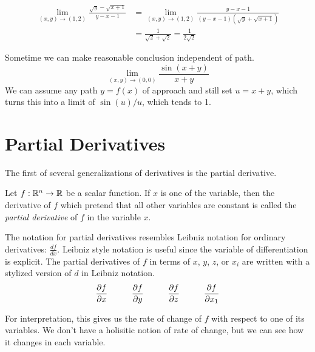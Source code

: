 \documentclass[fleqn,letterpaper]{report}
\begin{document}
\begin{example}
\begin{align*}
\lim_{(x,y) \rightarrow (1,2)} \frac{\sqrt{y} -
\sqrt{x+1}}{y-x-1} & = 
\lim_{(x,y) \rightarrow (1,2)} \frac{y-x-1}{(y-x-1)(\sqrt{y} +
\sqrt{x+1})} \\
& = \frac{1}{\sqrt{2} + \sqrt{2}} = \frac{1}{2\sqrt{2}} 
\end{align*}
\end{example}

\begin{example}
Sometime we can make reasonable conclusion independent of
path. 
\begin{equation*}
\lim_{(x,y) \rightarrow (0,0)} \frac{\sin(x+y)}{x+y} 
\end{equation*}
We can assume any path $y = f(x)$ of approach and still set $u
= x+y$, which turns this into a limit of $\sin(u)/u$, which
tends to 1.
\end{example}

\section{Partial Derivatives}
\label{partial-derivatives}

The first of several generalizations of derivatives is the
partial derivative. 

\begin{defn}
Let $f: \mathbb{R}^n \rightarrow \mathbb{R}$ be a scalar function. If $x$ is
one of the variable, then the derivative of $f$ which pretend
that all other variables are constant is called the
\emph{partial derivative} of $f$ in the variable $x$. 
\end{defn}

The notation for partial derivatives resembles Leibniz
notation for ordinary derivatives: $\frac{df}{dx}$. Leibniz
style notation is useful since the variable of differentiation
is explicit.  The partial derivatives of $f$ in terms of $x$,
$y$, $z$, or $x_i$ are written with a stylized version of $d$
in Leibniz notation.
\begin{equation*}
\frac{\partial f}{\partial x} \hspace{1cm} 
\frac{\partial f}{\partial y} \hspace{1cm} 
\frac{\partial f}{\partial z} \hspace{1cm} 
\frac{\partial f}{\partial x_1} 
\end{equation*}

For interpretation, this gives us the rate of change of $f$
with respect to one of its variables. We don't have a
holisitic notion of rate of change, but we can see how it
changes in each variable. 
\end{document}
